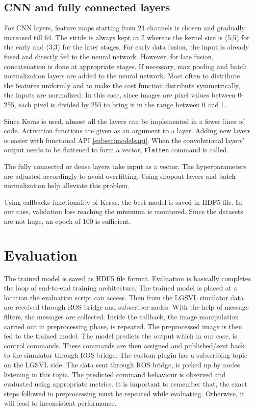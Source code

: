\subsection{CNN and fully connected layers}
For CNN layers, feature maps starting from 24 channels is chosen and gradually increased till 64.
The stride is always kept at 2 whereas the kernel size is (5,5) for the early and
(3,3) for the later stages. For early data fusion, the input is already fused and directly
fed to the neural network. However, for late fusion, concatenation is done at appropriate
stages. If necessary, max pooling and batch normalization layers are added to the neural
network. Most often to distribute the features uniformly and to make the cost function
distribute symmetrically, the inputs are normalized. In this case, since images are pixel
values between 0-255, each pixel is divided by 255 to bring it in the range between 0 and
1.

Since Keras is used, almost all the layers can be implemented in a fewer lines of code.
Activation functions are given as an argument to a layer. Adding new layers is easier with
functional API \ref{subsec:modelsapi}. When the convolutional layers' output needs to be
flattened to form a vector, \texttt{Flatten} command is called.

The fully connected or dense layers take input as a vector. The hyperparameters are
adjusted accordingly to avoid overfitting. Using dropout layers and batch normalization
help alleviate this problem.

Using callbacks functionality of Keras, the best model is saved in HDF5 file. In our case, validation
loss  reaching the minimum is monitored. Since the datasets are not huge, an epoch of 100
is sufficient.

\section{Evaluation}
The trained model is saved as HDF5 file format. Evaluation is basically completes the loop
of end-to-end training architecture. The trained model is placed at a location the
evaluation script can access. Then from the LGSVL simulator data are received through ROS
bridge and subscriber nodes. With the help of message filters, the messages are collected.
Inside the callback, the image manipulation carried out in preprocessing phase, is
repeated. The preprocessed image is then fed to the trained model. The model predicts the
output which in our case, is control commands. These commands are then assigned and published/sent
back to the simulator through ROS bridge. The custom plugin has a subscribing topic on the
LGSVL side. The data sent through ROS bridge, is picked up by nodes listening in this topic. The predicted command behaviour is observed and
evaluated using appropriate metrics. It is important to remember that, the exact steps followed
in preprocessing must be repeated while evaluating. Otherwise, it will lead to inconsistent
performance.
\iffalse
